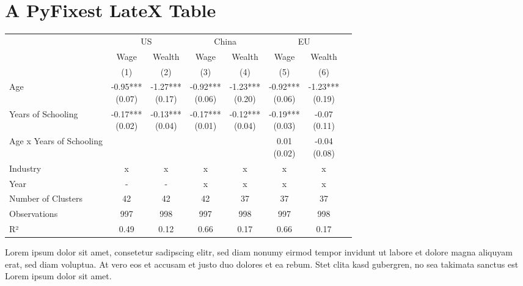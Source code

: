 \documentclass{article}%
\begin{document}
%
\normalsize%
\section{A PyFixest LateX Table}%
\label{sec:APyFixestLateXTable}%


\begin{table}[htbp]%
\renewcommand\cellalign{t}
\begin{threeparttable}
\begin{tabular}{lccccccc}
\toprule
 & \multicolumn{2}{c}{US} & \multicolumn{2}{c}{China} & \multicolumn{2}{c}{EU} \\
\cmidrule(lr){2-3} \cmidrule(lr){4-5} \cmidrule(lr){6-7} 
 & Wage & Wealth & Wage & Wealth & Wage & Wealth \\
 & (1) & (2) & (3) & (4) & (5) & (6) \\
\midrule
\addlinespace
Age & \makecell{-0.95*** \\ (0.07)} & \makecell{-1.27*** \\ (0.17)} & \makecell{-0.92*** \\ (0.06)} & \makecell{-1.23*** \\ (0.20)} & \makecell{-0.92*** \\ (0.06)} & \makecell{-1.23*** \\ (0.19)} \\
Years of Schooling & \makecell{-0.17*** \\ (0.02)} & \makecell{-0.13*** \\ (0.04)} & \makecell{-0.17*** \\ (0.01)} & \makecell{-0.12*** \\ (0.04)} & \makecell{-0.19*** \\ (0.03)} & \makecell{-0.07 \\ (0.11)} \\
Age x Years of Schooling &  &  &  &  & \makecell{0.01 \\ (0.02)} & \makecell{-0.04 \\ (0.08)} \\
\midrule
\addlinespace
Industry & x & x & x & x & x & x \\
Year & - & - & x & x & x & x \\
\midrule
\addlinespace
Number of Clusters & 42 & 42 & 42 & 37 & 37 & 37 \\
Observations & 997 & 998 & 997 & 998 & 997 & 998 \\
R² & 0.49 & 0.12 & 0.66 & 0.17 & 0.66 & 0.17 \\
\bottomrule
\end{tabular}
\footnotesize Lorem ipsum dolor sit amet, consetetur sadipscing elitr, sed diam nonumy eirmod tempor invidunt ut labore et dolore magna aliquyam erat, sed diam voluptua. At vero eos et accusam et justo duo dolores et ea rebum. Stet clita kasd gubergren, no sea takimata sanctus est Lorem ipsum dolor sit amet.
\end{threeparttable}%
\end{table}

%
\end{document}
